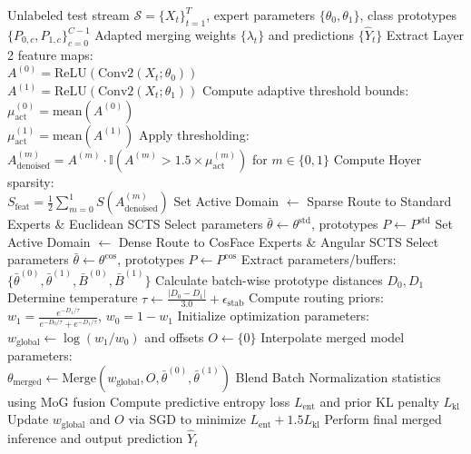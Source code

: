 \documentclass{article}
\theoremstyle{plain}
\theoremstyle{definition}
\theoremstyle{remark}
\begin{document}
\begin{algorithm}[tb]
  \caption{FL-AHR Test-Time Model Merging}
  \label{alg:fl-ahr}
  \begin{algorithmic}[1]
    \footnotesize
     Unlabeled test stream $\mathcal{S} = \{X_t\}_{t=1}^T$, expert parameters $\{\theta_0, \theta_1\}$, class prototypes $\{P_{0,c}, P_{1,c}\}_{c=0}^{C-1}$
     Adapted merging weights $\{\lambda_t\}$ and predictions $\{\hat{Y}_t\}$
      \STATE Extract Layer 2 feature maps: \\
      $A^{(0)} = \text{ReLU}(\text{Conv2}(X_t; \theta_0))$ \\
      $A^{(1)} = \text{ReLU}(\text{Conv2}(X_t; \theta_1))$
      \STATE Compute adaptive threshold bounds: \\
      $\mu^{(0)}_{\text{act}} = \text{mean}(A^{(0)})$ \\
      $\mu^{(1)}_{\text{act}} = \text{mean}(A^{(1)})$
      \STATE Apply thresholding: \\
      $A^{(m)}_{\text{denoised}} = A^{(m)} \cdot \mathbb{I}\left(A^{(m)} > 1.5 \times \mu^{(m)}_{\text{act}}\right)$ for $m \in \{0, 1\}$
      \STATE Compute Hoyer sparsity: \\
      $S_{\text{feat}} = \frac{1}{2} \sum_{m=0}^1 S\left(A^{(m)}_{\text{denoised}}\right)$
        \STATE Set Active Domain $\leftarrow$ Sparse
        \STATE Route to Standard Experts \& Euclidean SCTS
        \STATE Select parameters $\bar{\theta} \leftarrow \theta^{\text{std}}$, prototypes $P \leftarrow P^{\text{std}}$
      \ELSE
        \STATE Set Active Domain $\leftarrow$ Dense
        \STATE Route to CosFace Experts \& Angular SCTS
        \STATE Select parameters $\bar{\theta} \leftarrow \theta^{\text{cos}}$, prototypes $P \leftarrow P^{\text{cos}}$
      \ENDIF
      \STATE Extract parameters/buffers: $\{\bar{\theta}^{(0)}, \bar{\theta}^{(1)}, \bar{B}^{(0)}, \bar{B}^{(1)}\}$
      \STATE Calculate batch-wise prototype distances $D_0, D_1$
      \STATE Determine temperature $\tau \leftarrow \frac{|D_0 - D_1|}{3.0} + \epsilon_{\text{stab}}$
      \STATE Compute routing priors: $w_1 = \frac{e^{-D_1/\tau}}{e^{-D_0/\tau} + e^{-D_1/\tau}}$, $w_0 = 1 - w_1$
      \STATE Initialize optimization parameters: \\
      $w_{\text{global}} \leftarrow \log(w_1 / w_0)$ and offsets $O \leftarrow \{0\}$
        \STATE Interpolate merged model parameters: \\
        $\theta_{\text{merged}} \leftarrow \text{Merge}(w_{\text{global}}, O, \bar{\theta}^{(0)}, \bar{\theta}^{(1)})$
        \STATE Blend Batch Normalization statistics using MoG fusion
        \STATE Compute predictive entropy loss $L_{\text{ent}}$ and prior KL penalty $L_{\text{kl}}$
        \STATE Update $w_{\text{global}}$ and $O$ via SGD to minimize $L_{\text{ent}} + 1.5 L_{\text{kl}}$
      \ENDFOR
      \STATE Perform final merged inference and output prediction $\hat{Y}_t$
    \ENDFOR
  \end{algorithmic}
\end{algorithm}
\end{document}
